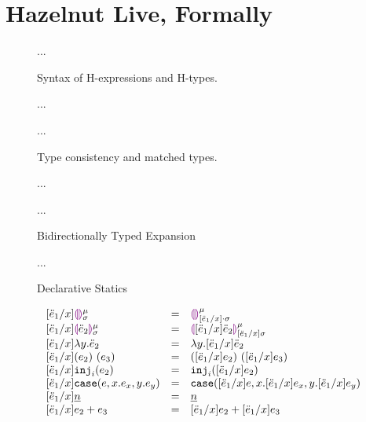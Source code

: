 
\clearpage
\newcommand{\calculusSec}{Hazelnut Live, Formally}
\section{\protect\calculusSec}
\label{sec:calculus}

\begin{figure}[h]
...
\caption{Syntax of H-expressions and H-types.}
\end{figure}

\begin{figure}[h]
...

...
\caption{Type consistency and matched types.}
\end{figure}

\begin{figure}[h]
...

...
\caption{Bidirectionally Typed Expansion}
\end{figure}

\begin{figure}[h!]
...
\caption{Declarative Statics}
\end{figure}

\begin{figure}[h!]
\[
\begin{array}{lcl}
[\ddot{e}_1 / x] \textcolor{violet}{\llparenthesis}\textcolor{violet}{\rrparenthesis}^{\mu}_{\sigma}
&=&
\textcolor{violet}{\llparenthesis}\textcolor{violet}{\rrparenthesis}^{\mu}_{[\ddot{e}_1 / x] \cdot \sigma}
\\
{[\ddot{e}_1 / x] \textcolor{violet}{\llparenthesis}\ddot{e}_2\textcolor{violet}{\rrparenthesis}^{\mu}_{\sigma}}
&=& 
\textcolor{violet}{\llparenthesis} [ \ddot{e}_1 / x ] \ddot{e}_2 \textcolor{violet}{\rrparenthesis}^{\mu}_{[\ddot{e}_1 / x] \sigma}
\\
{[\ddot{e}_1 / x] \lambda y.\ddot{e}_2}
&=&
{\lambda y.[\ddot{e}_1 / x] \ddot{e}_2}
\\
{[\ddot{e}_1 / x] (e_2)~(e_3)}
&=&
{([\ddot{e}_1 / x] e_2)~([\ddot{e}_1 / x] e_3)}
\\
{[\ddot{e}_1 / x] \texttt{inj}_{i}({e_2})}
&=&
{\texttt{inj}_{i}({[\ddot{e}_1 / x] e_2})}
\\
{[\ddot{e}_1 / x] \texttt{case}({e},{x}.{e_x},{y}.{e_y})}
&=&
{\texttt{case}({[\ddot{e}_1 / x]e},{x}.{[\ddot{e}_1 / x]e_x},{y}.{[\ddot{e}_1 / x]e_y})}
\\
{[\ddot{e}_1 / x] \underline{n}}
&=&
{\underline{n}}
\\
{[\ddot{e}_1 / x] e_2 + e_3}
&=&
{[\ddot{e}_1 / x] e_2 + [\ddot{e}_1 / x] e_3}
\end{array}
\]
\end{figure}

